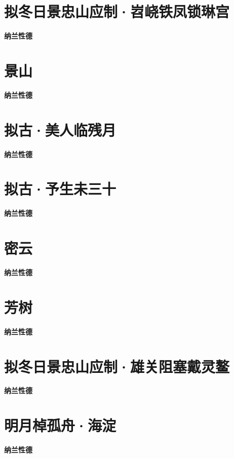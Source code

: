 \documentclass[12pt,a4paper]{ctexbook}
\begin{document}
\section{拟冬日景忠山应制·岧峣铁凤锁琳宫}
\textbf{纳兰性德}\par\vspace{0.5em}

\section{景山}
\textbf{纳兰性德}\par\vspace{0.5em}

\section{拟古·美人临残月}
\textbf{纳兰性德}\par\vspace{0.5em}

\section{拟古·予生未三十}
\textbf{纳兰性德}\par\vspace{0.5em}

\section{密云}
\textbf{纳兰性德}\par\vspace{0.5em}

\section{芳树}
\textbf{纳兰性德}\par\vspace{0.5em}

\section{拟冬日景忠山应制·雄关阻塞戴灵鳌}
\textbf{纳兰性德}\par\vspace{0.5em}

\section{明月棹孤舟·海淀}
\textbf{纳兰性德}\par\vspace{0.5em}
\end{document}
